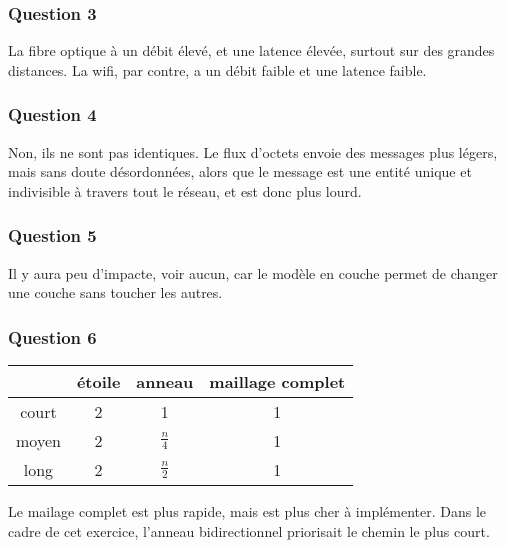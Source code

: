 \subsubsection{Question 3}
La fibre optique à un débit élevé, et une latence élevée, surtout sur des grandes distances.
La wifi, par contre, a un débit faible et une latence faible.
\subsubsection{Question 4}
Non, ils ne sont pas identiques. Le flux d'octets envoie des messages plus légers, mais sans doute désordonnées,
alors que le message est une entité unique et indivisible à travers tout le réseau, et est donc plus lourd.
\subsubsection{Question 5}
Il y aura peu d'impacte, voir aucun, car le modèle en couche permet de changer une couche sans toucher les autres.
\subsubsection{Question 6}
\begin{tabular}{|c|c|c|c|}
\hline
 & étoile & anneau & maillage complet \\
\hline
court & 2 & 1 & 1 \\
\hline
moyen & 2 & $\frac{n}{4}$ & 1 \\
\hline
long & 2 & $\frac{n}{2}$ & 1 \\
\hline
\end{tabular}

Le mailage complet est plus rapide, mais est plus cher à implémenter.
Dans le cadre de cet exercice, l'anneau bidirectionnel priorisait le chemin le plus court.
